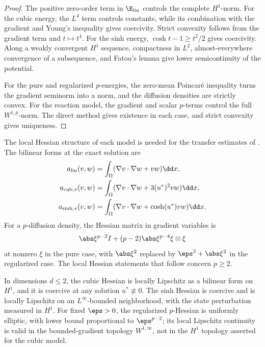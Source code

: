 \begin{proof}
The positive zero-order term in \(\E_{\rm lin}\) controls the complete \(H^1\)-norm. For the cubic
energy, the \(L^4\) term controls constants, while its combination with the gradient and Young's
inequality gives coercivity. Strict convexity follows from the gradient term and \(t\mapsto t^4\). For
the sinh energy, \(\cosh t-1\geq t^2/2\) gives coercivity. Along a weakly convergent \(H^1\) sequence,
compactness in \(L^2\), almost-everywhere convergence of a subsequence, and Fatou's lemma give lower
semicontinuity of the potential.

For the pure and regularized \(p\)-energies, the zero-mean Poincar\'e inequality turns the gradient
seminorm into a norm, and the diffusion densities are strictly convex. For the reaction model, the
gradient and scalar \(p\)-terms control the full \(W^{1,p}\)-norm. The direct method gives existence in
each case, and strict convexity gives uniqueness.
\end{proof}

The local Hessian structure of each model is needed for the transfer estimates of
. The bilinear forms at the exact solution are
\begin{align*}
 a_{\rm lin}(v,w)&=\int_\Omega(\nabla v\cdot\nabla w+vw)\dd x,\\
 a_{\rm cub,*}(v,w)&=\int_\Omega(\nabla v\cdot\nabla w+3(u^*)^2vw)\dd x,\\
 a_{\sinh,*}(v,w)&=\int_\Omega(\nabla v\cdot\nabla w+\cosh(u^*)vw)\dd x.
\end{align*}
For a \(p\)-diffusion density, the Hessian matrix in gradient variables is
\[
 \abs\xi^{p-2}I+(p-2)\abs\xi^{p-4}\xi\otimes\xi
\]
at nonzero \(\xi\) in the pure case, with \(\abs\xi^2\) replaced by
\(\eps^2+\abs\xi^2\) in the regularized case. The local Hessian statements that follow concern
\(p\geq2\).

\begin{proposition}
\label{prop:model-hessian}
In dimensions \(d\leq2\), the cubic Hessian is locally Lipschitz as a bilinear form on \(H^1\), and it
is coercive at any solution \(u^*\not\equiv0\). The sinh Hessian is coercive and is locally Lipschitz on
an \(L^\infty\)-bounded neighborhood, with the state perturbation measured in \(H^1\). For fixed
\(\eps>0\), the regularized \(p\)-Hessian is uniformly elliptic, with lower bound proportional to
\(\eps^{p-2}\); its local Lipschitz continuity is valid in the bounded-gradient topology
\(W^{1,\infty}\), not in the \(H^1\) topology asserted for the cubic model.
\end{proposition}

